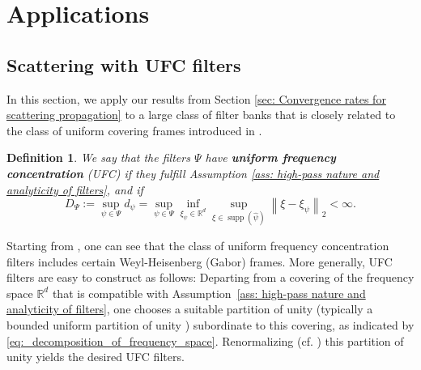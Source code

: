 \documentclass[11pt]{amsart}
\newcommand{\R}{{\mathbb{R}}}
\newcommand{\norm}[1]{\ensuremath{\left\lVert\text{}#1\text{}\right\rVert}}
\DeclareMathOperator{\supp}{supp}
\newtheorem{definition}[theorem]{Definition}
\newenvironment{proof sketch} {\textit{Proof sketch.}}{}
\begin{document}
  
  \section{Applications}\label{sec: Applications}
  
  \subsection{Scattering with UFC filters}\label{sec: Scattering with UFC filters}
  
  In this section, we apply our results from Section \ref{sec: Convergence rates for scattering propagation} to a large class of filter banks that is closely related to the class of uniform covering frames introduced in \cite{czaja2019analysis}. 
  
  \begin{definition}\label{def: uniform frequency concentration}
    We say that the filters $\Psi$ have \textbf{uniform frequency concentration} (UFC) if they fulfill Assumption \ref{ass: high-pass nature and analyticity of filters}, and if 
    \[D_\Psi:=\sup_{\psi \in \Psi} d_\psi=\sup_{\psi \in \Psi} \inf_{\xi_\psi \in \R^d}\sup_{\xi \in \supp(\widehat{\psi})} \norm{\xi-\xi_\psi}_2<\infty.\]
  \end{definition}
  
  Starting from \cite[Proposition 2.3]{czaja2019analysis}, one can see that
  the class of uniform frequency concentration filters includes certain Weyl-Heisenberg
  (Gabor) frames. More generally, UFC filters are easy to construct as follows:
  Departing from a covering of the frequency space ${\mathbb{R}}^{d}$ that
  is compatible with Assumption~\ref{ass: high-pass nature and analyticity of filters}, one chooses a suitable
  partition of unity (typically a bounded uniform partition of unity
  \cite[Definition 11.6.1]{heil2003introduction}) subordinate to this covering,
  as indicated by \eqref{eq:_decomposition_of_frequency_space}. Renormalizing
  (cf. \cite[Proposition 3]{wiatowski2017mathematical}) this partition of
  unity yields the desired UFC filters.
  
\end{document}
